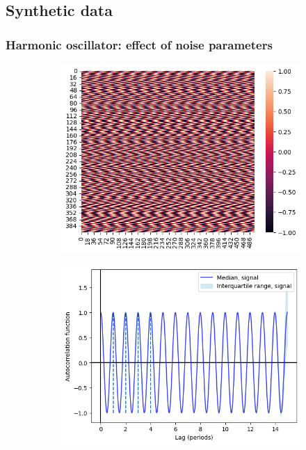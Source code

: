 \subsection{Synthetic data}
\label{subsubsec:analysis-characterisation-synthetic}

\subsubsection{Harmonic oscillator: effect of noise parameters}
\label{subsubsec:analysis-characterisation-acf-sinusoid}

\begin{figure}
  \centering
  \begin{subfigure}[t]{0.45\textwidth}
  \centering
    \includegraphics[width=\linewidth]{sinusoids_outofphase}
    \caption{
    }
    \label{fig:acf-sinusoids-nonoise-ts}
  \end{subfigure}%
  \centering
  \begin{subfigure}[t]{0.4\textwidth}
  \centering
    \includegraphics[width=\linewidth]{sinusoids_outofphase_acf_corrected}
    \caption{
    }
    \label{fig:acf-sinusoids-nonoise-acf}
  \end{subfigure}


\end{figure}
